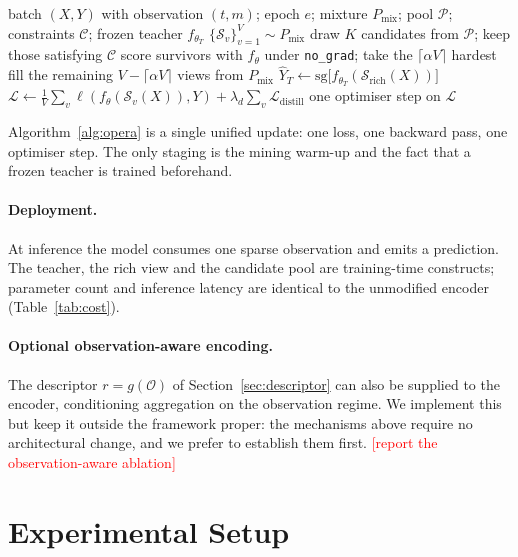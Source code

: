 \documentclass[sigconf,nonacm]{acmart}
\newcommand{\todo}[1]{\textcolor{red}{[#1]}}
\newcommand{\Sobs}{\mathcal{S}}
\newcommand{\Oobs}{\mathcal{O}}
\begin{document}
\begin{algorithm}[t]
\caption{OPERA training step}
\label{alg:opera}
\begin{algorithmic}[1]
\Require batch $(X,Y)$ with observation $(t,m)$; epoch $e$; mixture $P_{\mathrm{mix}}$; pool $\mathcal{P}$;
constraints $\mathcal{C}$; frozen teacher $f_{\theta_T}$
  \State $\{\Sobs_v\}_{v=1}^{V}\sim P_{\mathrm{mix}}$ 
\Else
  \State draw $K$ candidates from $\mathcal{P}$; keep those satisfying $\mathcal{C}$
  \State score survivors with $f_\theta$ under \texttt{no\_grad}; take the $\lceil\alpha V\rceil$ hardest
  \State fill the remaining $V-\lceil\alpha V\rceil$ views from $P_{\mathrm{mix}}$
\EndIf
\State $\hat{Y}_T \gets \mathrm{sg}\big[f_{\theta_T}(\Sobs_{\mathrm{rich}}(X))\big]$ 
\State $\mathcal{L}\gets\frac1V\sum_v \ell(f_\theta(\Sobs_v(X)),Y) + \lambda_d\sum_v \mathcal{L}_{\mathrm{distill}}$
\State one optimiser step on $\mathcal{L}$
\end{algorithmic}
\end{algorithm}

Algorithm~\ref{alg:opera} is a single unified update: one loss, one backward pass, one optimiser step. The only
staging is the mining warm-up and the fact that a frozen teacher is trained beforehand.

\paragraph{Deployment.}
At inference the model consumes one sparse observation and emits a prediction. The teacher, the rich view and
the candidate pool are training-time constructs; parameter count and inference latency are identical to the
unmodified encoder (Table~\ref{tab:cost}).

\paragraph{Optional observation-aware encoding.}
The descriptor $r=g(\Oobs)$ of Section~\ref{sec:descriptor} can also be supplied to the encoder, conditioning
aggregation on the observation regime. We implement this but keep it outside the framework proper: the
mechanisms above require no architectural change, and we prefer to establish them first. \todo{report the
observation-aware ablation}

\section{Experimental Setup}
\label{sec:setup}
\end{document}
